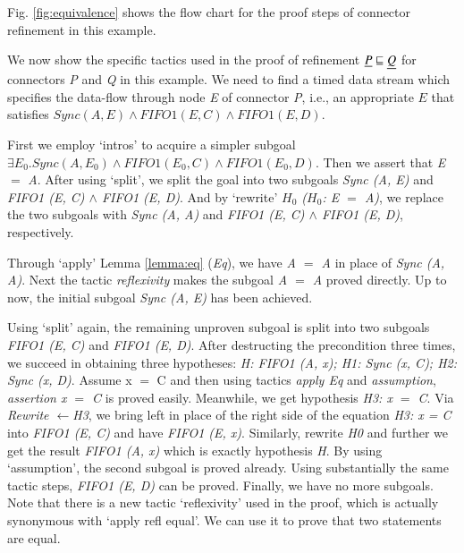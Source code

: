 \documentclass[preprint,3p]{elsarticle}
\begin{document}
Fig. \ref{fig:equivalence} shows the flow chart for the proof steps of
connector refinement in this example.


We now show the specific tactics used in the proof of refinement
$\emph{P} \sqsubseteq \emph{Q}$ for connectors \emph{P} and \emph{Q}
in this example.
We need to find a timed data stream which specifies the data-flow through node \emph{E} of connector \emph{P}, i.e., an appropriate \emph{$E$} that satisfies $Sync(A,E)\wedge FIFO1(E,C) \wedge FIFO1(E,D)$.

First we employ `intros' to acquire a simpler subgoal $\exists E_{0}. Sync(A,E_{0})
\wedge FIFO1(E_{0},C) \wedge FIFO1(E_{0},D)$. Then we assert that \emph{E} $=$ \emph{A}.%
After using `split', we split the goal into two subgoals \emph{Sync (A, E)} and \emph{FIFO1 (E, C) $\wedge$ FIFO1 (E, D)}. And by `rewrite' \emph{$H_{0}$ ($H_{0}$: E $=$ A)}, we replace the two subgoals with \emph{Sync (A, A)} and \emph{FIFO1 (E, C) $\wedge$ FIFO1 (E, D)}, respectively.

Through `apply' Lemma \ref{lemma:eq} (\emph{Eq}), we have \emph{A $=$ A} in place of \emph{Sync (A, A)}. Next the tactic \emph{reflexivity} makes the subgoal \emph{A $=$ A} proved directly. Up to now, the initial subgoal \emph{Sync (A, E)} has been achieved.

Using `split' again, the remaining unproven subgoal is split into two subgoals \emph{FIFO1 (E, C)} and \emph {FIFO1 (E, D)}.
After destructing the precondition three times, we succeed in obtaining three hypotheses: \emph{ H: FIFO1 (A, x); H1: Sync (x, C); H2: Sync (x, D)}. Assume x $=$ C and then using tactics \emph{apply Eq} and \emph{assumption}, \emph{assertion x $=$ C} is proved easily. Meanwhile, we get hypothesis \emph{H3: x $=$ C}. Via \emph{Rewrite $\leftarrow$H3}, we bring left in place of the right side of the equation \emph{H3: x = C} into \emph{FIFO1 (E, C)} and have \emph{FIFO1 (E, x)}. Similarly, rewrite \emph{H0} and further we get the result \emph{FIFO1 (A, x)} which is exactly hypothesis \emph{H}. By using `assumption', the second subgoal is proved already.
Using substantially the same tactic steps, \emph{FIFO1 (E, D)} can be proved. Finally, we have no more subgoals. Note that there is a new tactic `reflexivity' used in the proof, which is actually synonymous with `apply refl equal'. We can use it to prove that two statements are equal.
\end{document}
